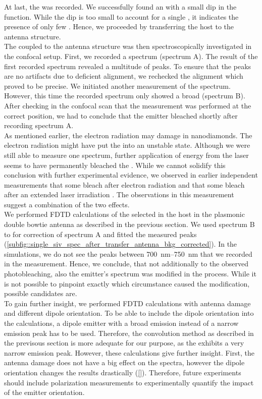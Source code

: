 			At last, the \gtf was recorded.
			We successfully found an \siv with a small dip in the \gt function.
			While the dip is too small to account for a single \siv, it indicates the presence of only few \sivs.
			Hence, we proceeded by transferring the host \nd to the antenna structure.
			\\
			The \siv coupled to the antenna structure was then spectroscopically investigated in the confocal setup.
			First, we recorded a spectrum (spectrum A).
			The result of the first recorded spectrum revealed a multitude of peaks.
			To ensure that the peaks are no artifacts due to deficient alignment, we rechecked the alignment which proved to be precise.
			We initiated another measurement of the spectrum.
			However, this time the recorded spectrum only showed a broad \bkg (spectrum B).
			After checking in the confocal scan that the measurement was performed at the correct position, we had to conclude that the emitter bleached shortly after recording spectrum A.
			\\
			As mentioned earlier, the electron radiation may damage \sivs in nanodiamonds.
			The electron radiation might have put the \siv into an unstable state.
			Although we were still able to measure one spectrum, further application of energy from the laser seems to have permanently bleached the \siv.
			While we cannot solidify this conclusion with further experimental evidence, we observed in earlier independent measurements that some \sivs bleach after electron radiation and that some \sivs bleach after an extended laser irradiation \cite{}.
			The observations in this measurement suggest a combination of the two effects.
			\\
			We performed FDTD calculations of the selected \siv in the host \nd in the plasmonic double bowtie antenna as described in the previous section.
			We used spectrum B to for \bkg correction of spectrum A and fitted the measured peaks (\autoref{subfig::single_siv_spec_after_transfer_antenna_bkg_corrected}).
			In the simulations, we do not see the peaks between \SIrange{700}{750}{nm} that we recorded in the measurement.
			Hence, we conclude, that not additionally to the observed photobleaching, also the emitter's spectrum was modified in the \pp process.
			While it is not possible to pinpoint exactly which circumstance caused the modification, possible candidates are.
			\\
			To gain further insight, we performed FDTD calculations with antenna damage and different dipole orientation.
			To be able to include the dipole orientation into the calculations, a dipole emitter with a broad emission instead of a narrow emission peak has to be used.
			Therefore, the convolution method as described in the previsous section is more adequate for our purpose, as the \siv exhibits a very narrow emission peak.
			However, these calculations give further insight.
			First, the antenna damage does not have a big effect on the spectra, however the dipole orientation changes the results drastically (\autoref{}).
			Therefore, future experiments should include polarization measurements to experimentally quantify the impact of the emitter orientation.

